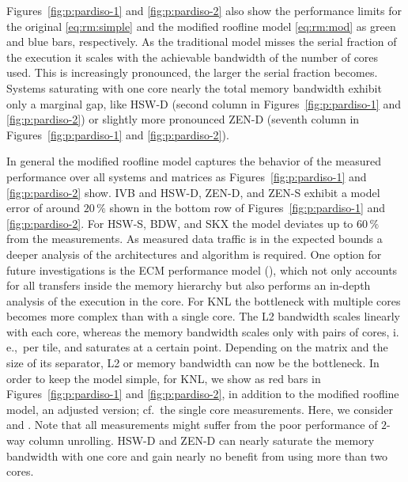 Figures~\ref{fig:p:pardiso-1} and \ref{fig:p:pardiso-2} also show the performance limits for the original
\eqref{eq:rm:simple} and the modified roofline model \eqref{eq:rm:mod}
as green and blue bars, respectively.
As the traditional model misses the serial fraction of the execution it scales
with the achievable bandwidth of the number of cores used.
This is increasingly pronounced, the larger the serial fraction becomes. 
%
Systems saturating with one core nearly the total memory bandwidth exhibit
only a marginal gap, like HSW-D (second column in Figures~\ref{fig:p:pardiso-1} and \ref{fig:p:pardiso-2}) or
slightly more pronounced ZEN-D (seventh column in Figures~\ref{fig:p:pardiso-1} and \ref{fig:p:pardiso-2}).

In general the modified roofline model captures the behavior of the measured
performance over all systems and matrices as Figures~\ref{fig:p:pardiso-1} and \ref{fig:p:pardiso-2} show.
%
%
IVB and HSW-D, ZEN-D, and ZEN-S exhibit a model error of around $20\,\%$ shown
in the bottom row of Figures~\ref{fig:p:pardiso-1} and \ref{fig:p:pardiso-2}.
For HSW-S, BDW, and SKX the model deviates up to $60\,\%$ from the measurements.
%
%
As measured data traffic is in the expected bounds a deeper analysis of the
architectures and algorithm is required.
One option for future investigations is the ECM performance
model (\cite{hager-2012-ecm}), which not only accounts for all transfers inside
the memory hierarchy but also performs an in-depth analysis of the execution in
the core.
%
%
For KNL the bottleneck with multiple cores becomes more complex than with a
single core.
The L2 bandwidth scales linearly with each core, whereas the memory bandwidth
scales only with pairs of cores, i.\,e.,\ per tile, and saturates at a certain
point.
Depending on the matrix and the size of its separator, L2 or memory bandwidth can
now be the bottleneck.
%
In order to keep the model simple, for KNL, we show
as red bars in Figures~\ref{fig:p:pardiso-1} and \ref{fig:p:pardiso-2},
in addition
to the modified
roofline model, 
an adjusted version; cf.\ the single core measurements.
Here, we consider  and .
Note that all measurements might suffer from the poor performance of $2$-way
column unrolling.
%
% 
HSW-D and ZEN-D can nearly saturate the memory bandwidth with one core and gain
nearly no benefit from using more than two cores.

